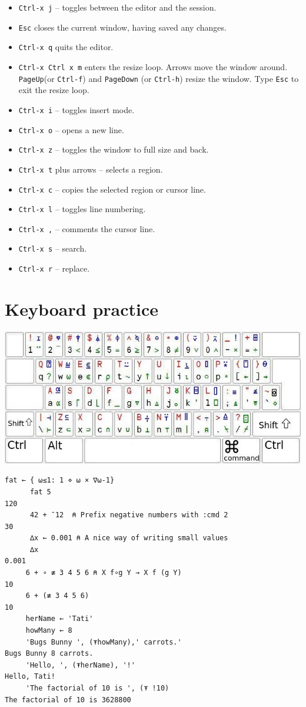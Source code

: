 \documentclass[a4paper,12pt]{book}
\begin{document}
\begin{itemize}
\item \verb|Ctrl-x j| -- toggles between the editor and the session.
\item \verb|Esc| closes the current window, having saved any changes.
\item \verb|Ctrl-x q| quits the editor.
\item \verb|Ctrl-x Ctrl x m| enters the resize loop.
  Arrows move the window around.
  \verb|PageUp|(or \verb|Ctrl-f|)
  and \verb|PageDown| (or \verb|Ctrl-h|)
  resize the window. Type \verb|Esc| to exit the resize loop.
\item \verb|Ctrl-x i| -- toggles insert mode.
\item \verb|Ctrl-x o| -- opens a new line.
\item \verb|Ctrl-x z| -- toggles the window to full size and back.
\item \verb|Ctrl-x t| plus arrows -- selects a region.
\item \verb|Ctrl-x c| -- copies the selected region or cursor line.
\item \verb|Ctrl-x l| -- toggles line numbering.
\item \verb|Ctrl-x ,| -- comments the cursor line.
\item \verb|Ctrl-x s| -- search.
\item \verb|Ctrl-x r| -- replace.
\end{itemize}

\section*{Keyboard practice}
\noindent
\includegraphics{figs/aplkb-largekeys.jpg}

\begin{lstlisting}[language=apl]
      fat ← { ⍵≤1: 1 ⋄ ⍵ × ∇⍵-1}
      fat 5
120
      42 + ¯12  ⍝ Prefix negative numbers with :cmd 2
30
      ∆x ← 0.001 ⍝ A nice way of writing small values 
      ∆x
0.001
     6 + ∘ ≢ 3 4 5 6 ⍝ X f∘g Y → X f (g Y)
10
     6 + (≢ 3 4 5 6)  
10
     herName ← 'Tati'
     howMany ← 8
     'Bugs Bunny ', (⍕howMany),' carrots.'
Bugs Bunny 8 carrots.
     'Hello, ', (⍕herName), '!'
Hello, Tati!
     'The factorial of 10 is ', (⍕ !10)
The factorial of 10 is 3628800     
\end{lstlisting}
\end{document}
